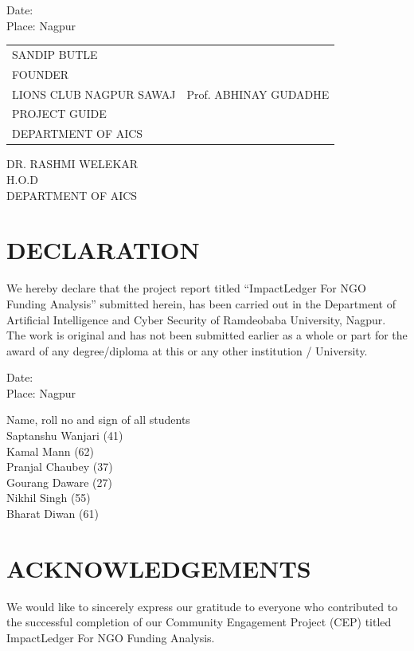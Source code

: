 \documentclass[12pt,a4paper]{article}
\begin{document}
Date:\\
Place: Nagpur

\vspace{2cm}
\begin{tabular}{p{}p{}}
	\centering SANDIP BUTLE          \\FOUNDER\\LIONS CLUB NAGPUR SAWAJ &
	\centering Prof. ABHINAY GUDADHE \\PROJECT GUIDE\\DEPARTMENT OF AICS
\end{tabular}

\vspace{1.5cm}
\begin{center}
	DR. RASHMI WELEKAR\\
	H.O.D\\
	DEPARTMENT OF AICS
\end{center}

\newpage
\section{DECLARATION}
We hereby declare that the project report titled ``ImpactLedger For NGO Funding Analysis'' submitted herein, has been carried out in the Department of Artificial Intelligence and Cyber Security of Ramdeobaba University, Nagpur. The work is original and has not been submitted earlier as a whole or part for the award of any degree/diploma at this or any other institution / University.

Date:\\
Place: Nagpur

\vspace{1.5cm}
Name, roll no and sign of all students\\
Saptanshu Wanjari (41)\\
Kamal Mann (62)\\
Pranjal Chaubey (37)\\
Gourang Daware (27)\\
Nikhil Singh (55)\\
Bharat Diwan (61)

\newpage
\section{ACKNOWLEDGEMENTS}
We would like to sincerely express our gratitude to everyone who contributed to the successful completion of our Community Engagement Project (CEP) titled ImpactLedger For NGO Funding Analysis.
\end{document}
